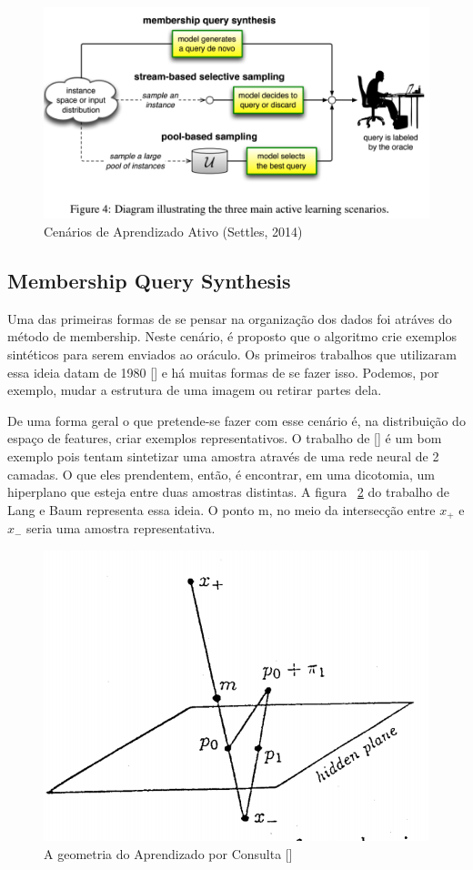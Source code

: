 \begin{figure}
  \centering
  \includegraphics[width=.8\textwidth]{figures/active_learning_scenarios.png}
  \caption{Cenários de Aprendizado Ativo (Settles, 2014)}
  \label{fig:ActiveLearningScenarios}
\end{figure}


\subsection{Membership Query Synthesis}
\label{sec:cenarios_membeship}

Uma das primeiras formas de se pensar na organização dos dados foi atráves do método de membership. Neste cenário, é proposto que o algoritmo crie exemplos sintéticos para serem enviados ao oráculo. Os primeiros trabalhos que utilizaram essa ideia datam de 1980 [\cite{shapiro1981algorithm, shapiro1982algorithmic, shapiro198algorithmic_2}] e há muitas formas de se fazer isso. Podemos, por exemplo, mudar a estrutura de uma imagem ou retirar partes dela. 

De uma forma geral o que pretende-se fazer com esse cenário é, na distribuição do espaço de features, criar exemplos representativos. O trabalho de [\cite{baum1992query}] é um bom exemplo pois tentam sintetizar uma amostra através de uma rede neural de 2 camadas. O que eles prendentem, então, é encontrar, em uma dicotomia, um hiperplano que esteja entre duas amostras distintas. A figura ~\ref{fig:LangBaum_GeometryQueryLearning} do trabalho de Lang e Baum representa essa ideia. O ponto m, no meio da intersecção entre $x_+$ e $x_-$ seria uma amostra representativa.

\begin{figure}
  \centering
  \includegraphics[width=.4\textwidth]{figures/lang_baum_geometry_query_learning.png}
  \caption{A geometria do Aprendizado por Consulta [\cite{baum1992query}]}
  \label{fig:LangBaum_GeometryQueryLearning}
\end{figure}

